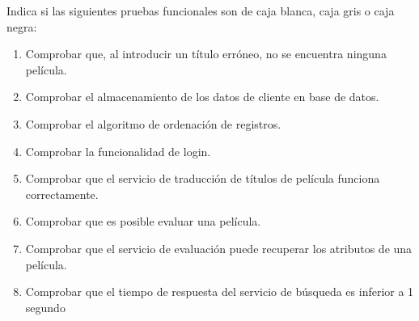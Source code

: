 \begin{enunciado}
    Indica si las siguientes pruebas funcionales son de caja blanca, caja gris o caja negra:
    \begin{enumerate}
        \item Comprobar que, al introducir un título erróneo, no se encuentra ninguna película.
        \item Comprobar el almacenamiento de los datos de cliente en base de datos.
        \item Comprobar el algoritmo de ordenación de registros.
        \item Comprobar la funcionalidad de login.
        \item Comprobar que el servicio de traducción de títulos de película funciona correctamente.
        \item Comprobar que es posible evaluar una película.
        \item Comprobar que el servicio de evaluación puede recuperar los atributos de una película.
        \item Comprobar que el tiempo de respuesta del servicio de búsqueda es inferior a 1 segundo
    \end{enumerate}
\end{enunciado}

